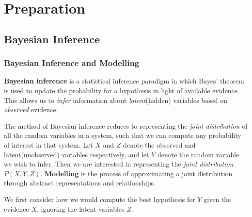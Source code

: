 \documentclass[12pt,a4paper,twoside,openright]{report}
\theoremstyle{definition}
\begin{document}
\chapter{Preparation}

\section{Bayesian Inference}
\subsection{Bayesian Inference and Modelling}

\textbf{Bayesian inference} is a statistical inference paradigm in which Bayes' theorem is used to update the probability for a hypothesis in light of available evidence. This allows us to \textit{infer} information about \textit{latent}(hidden) variables based on \textit{observed} evidence.

The method of Bayesian inference reduces to representing the \textit{joint distribution} of all the random variables in a system, such that we can compute any probability of interest in that system. Let $X$ and $Z$ denote the observed and latent(unobserved) variables respectively, and let $Y$ denote the random variable we wish to infer. 
Then we are interested in representing the \textit{joint distribution} $P(X,Y,Z)$. \textbf{Modelling} is the process of approximating a joint distribution through abstract representations and relationships.

We first consider how we would compute the best hypothesis for $Y$ given the evidence $X$, ignoring the latent variables $Z$.
\end{document}
